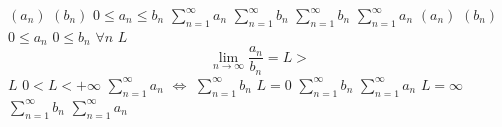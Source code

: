 \documentclass{article}
\begin{document}
$(a_n)$
$(b_n)$
$0 \leq a_n \leq b_n$
$\displaystyle\sum_{n=1}^{\infty}{a_n}$
$\displaystyle\sum_{n=1}^{\infty}{b_n}$
$\displaystyle\sum_{n=1}^{\infty}{b_n}$
$\displaystyle\sum_{n=1}^{\infty}{a_n}$
$(a_n)$
$(b_n)$
$0 \leq a_n$
$0 \leq b_n$
$\forall n$
$L$
$$
\displaystyle\lim_{n \to \infty}\frac{a_n}{b_n} = L
>$$
$L$
$0<L<+\infty$
$\displaystyle\sum_{n=1}^{\infty}{a_n}$
$\iff$
$\displaystyle\sum_{n=1}^{\infty}{b_n}$
$L = 0$
$\displaystyle\sum_{n=1}^{\infty}{b_n}$
$\displaystyle\sum_{n=1}^{\infty}{a_n}$
$L = \infty$
$\displaystyle\sum_{n=1}^{\infty}{b_n}$
$\displaystyle\sum_{n=1}^{\infty}{a_n}$
\end{document}
